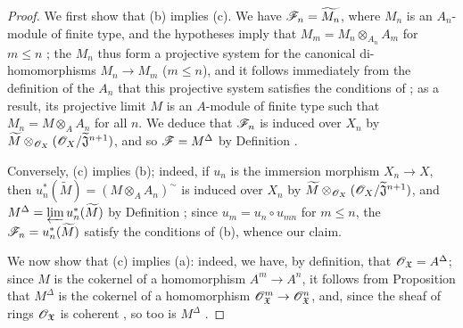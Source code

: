\begin{proof}
We first show that (b) implies (c).
We have $\mathscr{F}_n=\widetilde{M_n}$, where $M_n$ is an $A_n$-module of finite type, and the hypotheses imply that $M_m=M_n\otimes_{A_n}A_m$ for $m\leq n$ ; the $M_n$ thus form a projective system for the canonical di-homomorphisms $M_n\to M_m$ ($m\leq n$), and it follows immediately from the definition of the $A_n$ that this projective system satisfies the conditions of ; as a result, its projective limit $M$ is an $A$-module of finite type such that $M_n=M\otimes_A A_n$ for all $n$.
We deduce that $\mathscr{F}_n$ is induced over $X_n$ by $\widetilde{M}\otimes_{\mathscr{O}_X}(\mathscr{O}_X/\widetilde{\mathfrak{J}}^{n+1})$, and so $\mathscr{F}=M^\Delta$ by Definition .

Conversely, (c) implies (b); indeed, if $u_n$ is the immersion morphism $X_n\to X$, then $u_n^*(\widetilde{M})=(M\otimes_A A_n)^\sim$ is induced over $X_n$ by $\widetilde{M}\otimes_{\mathscr{O}_X}(\mathscr{O}_X/\widetilde{\mathfrak{J}}^{n+1})$, and $M^\Delta=\varprojlim u_n^*(\widetilde{M})$ by Definition ; since $u_m=u_n\circ u_{mn}$ for $m\leq n$, the $\mathscr{F}_n=u_n^*(\widetilde{M})$ satisfy the conditions of (b), whence our claim.

We now show that (c) implies (a): indeed, we have, by definition, that $\mathscr{O}_\mathfrak{X}=A^\Delta$; since $M$ is the cokernel of a homomorphism $A^m\to A^n$, it follows from Proposition  that $M^\Delta$ is the cokernel of a homomorphism $\sh{O}_\mathfrak{X}^m\to\sh{O}_\mathfrak{X}^n$, and, since the sheaf of rings $\mathscr{O}_\mathfrak{X}$ is coherent , so too is $M^\Delta$ .


\end{proof}
